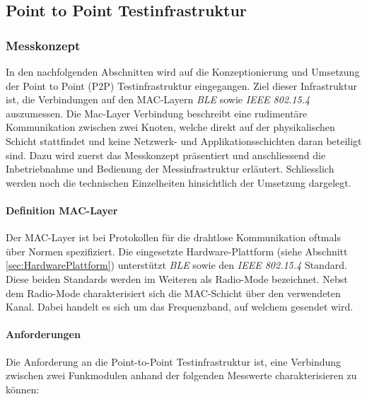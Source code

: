 \vspace*{4cm}
\begin{center}
\part{Point to Point Testinfrastruktur}\label{part:PointtoPointTestinfrastruktur}
\end{center}
\vspace*{\fill}
\clearpage

\section{Messkonzept}\label{sec:KonzeptP2PMessung}
In den nachfolgenden Abschnitten wird auf die Kon­zep­ti­o­nie­rung und Umsetzung der Point to Point (P2P) Testinfrastruktur eingegangen.
Ziel dieser Infrastruktur ist, die Verbindungen auf den MAC-Layern \textit{BLE} sowie \textit{IEEE 802.15.4} auszumessen.
Die Mac-Layer Verbindung beschreibt eine rudimentäre Kommunikation zwischen zwei Knoten, welche direkt auf der physikalischen Schicht stattfindet und keine Netzwerk- und Applikationsschichten daran beteiligt sind.
Dazu wird zuerst das Messkonzept präsentiert und anschliessend die Inbetriebnahme und Bedienung der Messinfrastruktur erläutert. Schliesslich werden noch die technischen Einzelheiten hinsichtlich der Umsetzung dargelegt.

\subsection{Definition MAC-Layer}\label{sec:MAC-LayerP2P}
Der MAC-Layer ist bei Protokollen für die drahtlose Kommunikation oftmals über Normen spezifiziert. Die eingesetzte Hardware-Plattform (siehe Abschnitt \ref{sec:HardwarePlattform}) unterstützt \textit{BLE} sowie den \textit{IEEE 802.15.4} Standard.
Diese beiden Standards werden im Weiteren als Radio-Mode bezeichnet. Nebst dem Radio-Mode charakterisiert sich die MAC-Schicht über den verwendeten Kanal. Dabei handelt es sich um das Frequenzband, auf welchem gesendet wird. 

\subsection{Anforderungen}\label{subsec:AnforderungenP2P}

Die Anforderung an die Point-to-Point Testinfrastruktur ist, eine Verbindung zwischen zwei Funkmodulen anhand der folgenden Messwerte charakterisieren zu können:

